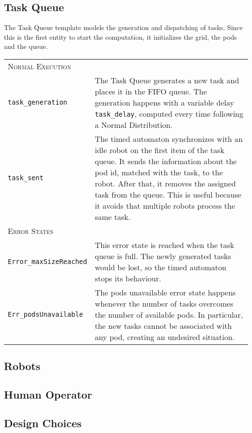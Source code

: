 \subsection{Task Queue}
The Task Queue template models the generation and dispatching of tasks. Since this is the first entity to start the computation, it initializes the grid, the pods and the queue. 

\begin{tabularx}{\textwidth}{lX}
\multicolumn{2}{l}{{\scshape Normal Execution}}
 \vspace{0,2cm}\\
\texttt{task\_generation} & The Task Queue generates a new task and places it in the FIFO queue. The generation happens with a variable delay \texttt{task\_delay}, computed every time following a Normal Distribution. \vspace{0,2cm}\\
\texttt{task\_sent} & The timed automaton synchronizes with an idle robot on the first item of the task queue. It sends the information about the pod id, matched with the task, to the robot. After that, it removes the assigned task from the queue. This is useful because it avoids that multiple robots process the same task. \vspace{0,4cm}\\
\multicolumn{2}{l}{{\scshape Error States}} \vspace{0,2cm}\\
\texttt{Error\_maxSizeReached}  & This error state is reached when the task queue is full. The newly generated tasks would be lost, so the timed automaton stops its behaviour. \vspace{0,2cm}\\
\texttt{Err\_podsUnavailable}   & The pods unavailable error state happens whenever the number of tasks overcomes the number of available pods. In particular, the new tasks cannot be associated with any pod, creating an undesired situation.  \vspace{0,2cm}\\
\end{tabularx}

\subsection{Robots}

\subsection{Human Operator}	

\subsection{Design Choices}
